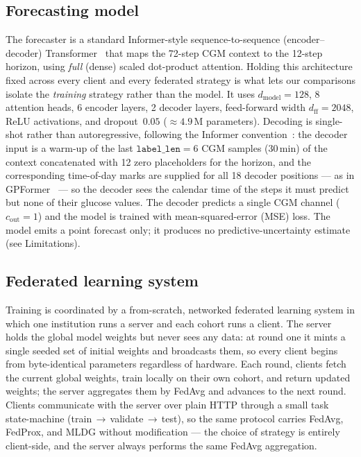 \documentclass[10pt,letterpaper]{article}
\begin{document}
\subsection*{Forecasting model}

The forecaster is a standard Informer-style sequence-to-sequence
(encoder--decoder) Transformer~\cite{zhou2021informer} that maps
the 72-step CGM context to the 12-step horizon, using \emph{full}
(dense) scaled dot-product attention.
Holding this architecture fixed across every client and every federated
strategy is what lets our comparisons isolate the \emph{training} strategy rather
than the model. It uses
$d_{\text{model}}=128$, 8 attention heads, 6 encoder layers, 2 decoder layers,
feed-forward width $d_{\text{ff}}=2048$, ReLU activations, and dropout~$0.05$
($\approx 4.9$\,M parameters). Decoding is single-shot rather than
autoregressive, following the Informer convention~\cite{zhou2021informer}: the
decoder input is a warm-up of the last $\texttt{label\_len}=6$ CGM samples
(30\,min) of the context concatenated with 12 zero placeholders for the horizon,
and the corresponding time-of-day marks are supplied for all 18 decoder
positions --- as in GPFormer~\cite{zhu2024gpformer} --- so the decoder sees the
calendar time of the steps it must predict but
none of their glucose values. The decoder predicts a single CGM channel ($c_{\text{out}}=1$) and the
model is trained with mean-squared-error (MSE) loss. The model emits a point
forecast only; it produces no predictive-uncertainty estimate (see Limitations).

\subsection*{Federated learning system}

Training is coordinated by a from-scratch, networked federated learning system
in which one institution runs a server and each cohort runs a client. The server
holds the global model weights but never sees any data: at round one it mints a
single seeded set of initial weights and broadcasts them, so every client begins
from byte-identical parameters regardless of hardware. Each round, clients fetch
the current global weights, train locally on their own cohort, and return updated
weights; the server aggregates them by FedAvg and advances to the next round.
Clients communicate with the server over plain HTTP through a small task
state-machine (train\,$\rightarrow$\,validate\,$\rightarrow$\,test), so the same
protocol carries FedAvg, FedProx, and MLDG without modification --- the choice of
strategy is entirely client-side, and the server always performs the same FedAvg
aggregation.
\end{document}
